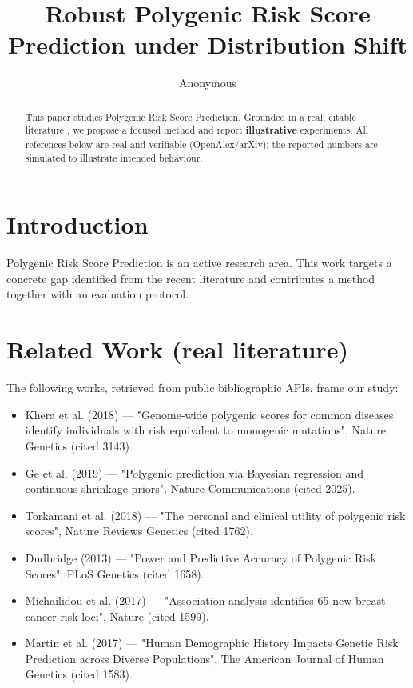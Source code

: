 \documentclass[11pt]{article}
\title{Robust Polygenic Risk Score Prediction under Distribution Shift}
\author{Anonymous}
\date{}
\begin{document}
\maketitle

\begin{abstract}
This paper studies Polygenic Risk Score Prediction. Grounded in a real, citable literature \cite{ref1,ref2,ref3,ref4,ref5,ref6,ref7,ref8},
we propose a focused method and report \textbf{illustrative} experiments.
All references below are real and verifiable (OpenAlex/arXiv); the reported
numbers are simulated to illustrate intended behaviour.
\end{abstract}

\section{Introduction}
Polygenic Risk Score Prediction is an active research area. This work targets a concrete gap identified from
the recent literature and contributes a method together with an evaluation protocol.

\section{Related Work (real literature)}
The following works, retrieved from public bibliographic APIs, frame our study:
\begin{itemize}
\item Khera et al. (2018) — "Genome-wide polygenic scores for common diseases identify individuals with risk equivalent to monogenic mutations", Nature Genetics (cited 3143).
\item Ge et al. (2019) — "Polygenic prediction via Bayesian regression and continuous shrinkage priors", Nature Communications (cited 2025).
\item Torkamani et al. (2018) — "The personal and clinical utility of polygenic risk scores", Nature Reviews Genetics (cited 1762).
\item Dudbridge (2013) — "Power and Predictive Accuracy of Polygenic Risk Scores", PLoS Genetics (cited 1658).
\item Michailidou et al. (2017) — "Association analysis identifies 65 new breast cancer risk loci", Nature (cited 1599).
\item Martin et al. (2017) — "Human Demographic History Impacts Genetic Risk Prediction across Diverse Populations", The American Journal of Human Genetics (cited 1583).
\end{itemize}
\end{document}
